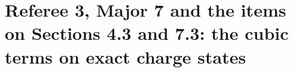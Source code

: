 \providecommand{\dref}[1]{\texttt{\detokenize{#1}}}
\def\v#1{\mathbf{#1}}%
\section{Referee 3, Major 7 and the items on Sections 4.3 and 7.3: the cubic terms on exact charge states}\label{sec:ref3cubic}

